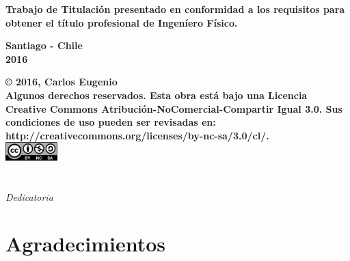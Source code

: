 \documentclass[12pt]{book}
\begin{document}
\begin{titlepage}
\begin{flushright}
  \begin{center}
    \textbf{Trabajo de Titulación presentado en conformidad a los
    requisitos para obtener el título profesional de Ingeníero Físico.}
  \end{center}
  \end{flushright}

\vfill

  \begin{center}
    \textbf{Santiago -  Chile\\2016}
  \end{center}
\end{titlepage}

\newpage
\mbox{}
\thispagestyle{empty}

\vfill
\begin{center}
\textbf{© 2016, Carlos Eugenio\\
Algunos  derechos  reservados. 
Esta  obra  está  bajo  una  Licencia  Creative  Commons  Atribución-NoComercial-Compartir Igual  
3.0. Sus condiciones de uso pueden ser revisadas 
en: http://creativecommons.org/licenses/by-nc-sa/3.0/cl/.}
\\
\includegraphics[width=2cm]{by-nc-sa.png}
\end{center}


\newpage
\chapter*{}
\begin{flushright}
\textit{Dedicatoria}
\end{flushright}
\newpage

\chapter*{Agradecimientos} %
\end{document}
